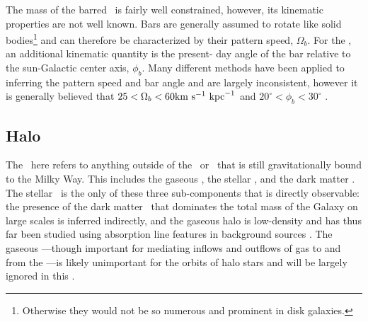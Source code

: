 The mass of the barred \mwbulge\ is fairly well constrained, however, its
kinematic properties are not well known. Bars are generally assumed to rotate
like solid bodies\footnote{Otherwise they would not be so numerous and prominent
in disk galaxies.} and can therefore be characterized by their pattern speed,
$\Omega_b$. For the \mwbulge, an additional kinematic quantity is the present-
day angle of the bar relative to the sun-Galactic center axis, $\phi_b$. Many
different methods have been applied to inferring the pattern speed and bar angle
and are largely inconsistent, however it is generally believed that $25 <
\Omega_b < 60 \mathrm{km}~\mathrm{s}^{-1}~\mathrm{kpc}^{-1}$ and $20^\circ < \phi_b < 30^\circ$ \citep{dwek95,
stanek97, debattista02, shen10, wegg13, cao13, wegg15, portail15}.



\subsection{Halo}\label{sec:mw-halo}

The \mwhalo\ here refers to anything outside of the \mwdisk\ or \mwbulge\ that
is still gravitationally bound to the Milky Way. This includes the gaseous
\mwhalo, the stellar \mwhalo, and the dark matter \mwhalo. The stellar \mwhalo\
is the only of these three sub-components that is directly observable: the
presence of the dark matter \mwhalo\ that dominates the total mass of the Galaxy
on large scales is inferred indirectly, and the gaseous halo is low-density and
has thus far been studied using absorption line features in background sources
\citep{miller13}. The gaseous \mwhalo---though important for mediating inflows
and outflows of gas to and from the \mwdisk---is likely unimportant for the
orbits of halo stars and will be largely ignored in this \article. %
\citep[$M_{\rm h:g} \approx 10^{10}~\msun \ll $][]{blitz10, salem15}


